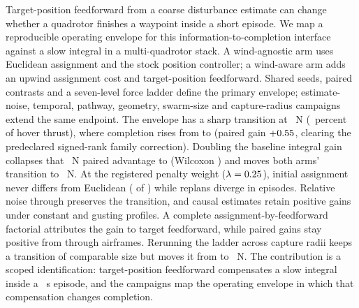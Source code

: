 
Target-position feedforward from a coarse disturbance estimate can change
whether a quadrotor finishes a waypoint inside a short episode. We map a
reproducible operating envelope for this information-to-completion interface
against a slow integral in a multi-quadrotor stack. A wind-agnostic arm uses
Euclidean assignment and the stock position controller; a wind-aware arm adds
an upwind assignment cost and target-position feedforward. Shared seeds, paired
contrasts and a seven-level force ladder define the primary envelope;
estimate-noise, temporal, pathway, geometry, swarm-size and capture-radius
campaigns extend the same endpoint. The envelope has a sharp transition at
\KneeLevel{}~N (\KneePctHover{}~percent of hover thrust), where completion
rises from \KneeAgnostic{} to \KneeAware{} (paired gain $+0.55{}$,
clearing the predeclared signed-rank family correction). Doubling the
baseline integral gain collapses that \KneeLevel{}~N paired advantage to
\AuditKiTenGain{} (Wilcoxon \AuditKiTenWilcoxonP{}) and moves both arms'
transition to \AuditKiTenKnee{}~N. At the registered penalty weight
($\lambda=0.25{}$), initial assignment never differs from Euclidean
(\AuditInitialDivergence{} of \AuditAwareEpisodes{}) while replans diverge in
\AuditUsedDivergence{} episodes. Relative noise through
\BestSigma{} preserves the transition, and causal estimates retain positive
gains under constant and gusting profiles. A complete
assignment-by-feedforward factorial attributes the gain to target feedforward,
while paired gains stay positive from \ScaleMinSize{} through \ScaleMaxSize{}
airframes. Rerunning the ladder across capture radii keeps a transition of
comparable size but moves it from \RadiusTightPeakForce{} to
\RadiusWidePeakForce{}~N. The contribution is a scoped identification:
target-position feedforward compensates a slow integral inside a
\EpisodeHorizonS{}~s episode, and the campaigns map the operating envelope in
which that compensation changes completion.
